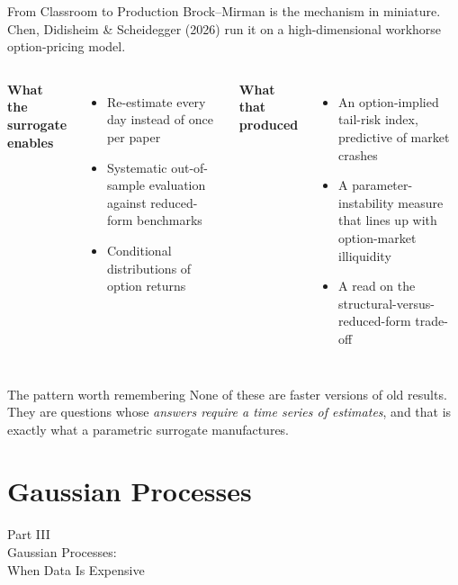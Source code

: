 \documentclass[aspectratio=169,11pt]{beamer}
\newcommand{\emphc}[1]{\textcolor{harvardcrimson}{#1}}
\begin{document}
\begin{frame}{From Classroom to Production}
\small
Brock--Mirman is the mechanism in miniature. Chen, Didisheim \& Scheidegger (2026) run it on a high-dimensional workhorse option-pricing model.

\vspace{0.2cm}
\begin{columns}[T]
\textbf{What the surrogate enables}
\begin{itemize}\itemsep1pt
  \item Re-estimate \emphc{every day} instead of once per paper
  \item Systematic out-of-sample evaluation against reduced-form benchmarks
  \item Conditional distributions of option returns
\end{itemize}

\textbf{What that produced}
\begin{itemize}\itemsep1pt
  \item An option-implied \emphc{tail-risk index}, predictive of market crashes
  \item A \emphc{parameter-instability} measure that lines up with option-market illiquidity
  \item A read on the structural-versus-reduced-form trade-off
\end{itemize}
\end{columns}

\vspace{0.25cm}
\begin{alertblock}{The pattern worth remembering}
None of these are faster versions of old results. They are questions whose \emph{answers require a time series of estimates}, and that is exactly what a parametric surrogate manufactures.
\end{alertblock}
\end{frame}


\section{Gaussian Processes}

\begin{frame}{}
\begin{center}
{\Huge \textcolor{uzhblue}{Part III}}\\[0.8em]
{\LARGE Gaussian Processes:\\[0.3em] When Data Is Expensive}
\end{center}
\end{frame}
\end{document}
